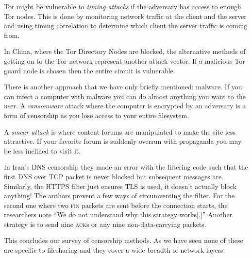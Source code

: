Tor might be vulnerable to \emph{timing attacks} if the adversary has access to
enough Tor nodes.\cite[p.\@ 9]{wendzelSurveyInternetCensorship2025} This is done
by monitoring network traffic at the client and the server and using timing
correlation to determine which client the server traffic is coming from.

In China, where the Tor Directory Nodes are blocked, the alternative methods of
getting on to the Tor network represent another attack vector. If a malicious
Tor guard node is chosen then the entire circuit is vulnerable.

There is another approach that we have only briefly mentioned: malware. If you
can infect a computer with malware you can do almost anything you want to the
user. A \emph{ransomware} attack where the computer is encrypted by an adversary
is a form of censorship as you lose access to your entire filesystem.

A \emph{smear attack} is where content forums are manipulated to make the site
less attractive. If your favorite forum is suddenly overrun with propaganda you
may be less inclined to visit it.

In Iran's DNS censorship they made an error with the filtering code
\cite{bockDetectingEvadingCensorshipDepth} such that the first DNS over TCP
packet is never blocked but subsequent messages are. Similarly, the HTTPS filter
just ensures TLS is used, it doesn't actually block anything! The authors
prevent a few ways of circumventing the filter. For the second one where two
\textsc{fin} packets are sent before the connection starts, the researchers note
``We do not understand why this strategy works[.]'' Another strategy is to send
nine \textsc{ack}s or any nine non-data-carrying packets.

This concludes our survey of censorship methods. As we have seen none of these
are specific to filesharing and they cover a wide breadth of network layers.
